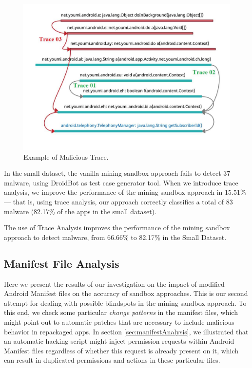 \begin{figure}
\centering
\includegraphics[scale=0.28]{images/maliciousTrace_example01.pdf}
\caption{Example of Malicious Trace.}
 \label{fig:maliciousTrace}
\end{figure}


In the small dataset, the vanilla mining sandbox approach fails
to detect \num{37} malware, using DroidBot as test case generator
tool. When we introduce trace analysis, we improve the
performance of the mining sandbox approach in \num{15.51}\%---
that is, using trace analysis, our approach correctly
classifies a total of 83 malware (\num{82.17}\% of the apps
in the small dataset). 

\begin{obs}{1}{}
  The use of Trace Analysis improves the performance
  of the mining sandbox approach to detect malware,
  from \num{66.66}\% to \num{82.17}\% in the
  Small Dataset. 
\end{obs}

\subsection{Manifest File Analysis}

Here we present the results of our investigation on the impact of modified Android Manifest files on the accuracy of sandbox approaches. This is
our second attempt for dealing with possible blindspots in the mining sandbox approach. 
To this end, we check some particular \emph{change patterns} in the manifest files, which might point out to automatic patches
that are necessary to include malicious behavior in repackaged apps. In section \ref{sec:manifestAnalysis}, we
illustrated that an automatic hacking script might inject permission requests within Android Manifest files regardless of whether this request is already present on it,
which can result in duplicated permissions and actions in these particular files.

